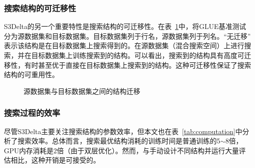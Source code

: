 \subsubsection{搜索结构的可迁移性}
S3Delta的另一个重要特性是搜索结构的可迁移性。在表~\ref{tab:transfer}中，将GLUE基准测试分为源数据集和目标数据集。目标数据集列于行名，源数据集列于列名。“无迁移” 表示该结构是在目标数据集上搜索得到的。在源数据集（混合搜索空间）上进行搜索，并在目标数据集上训练搜索到的结构。可以看出，搜索到的结构具有高度可迁移性，有时甚至优于直接在目标数据集上搜索到的结构。这种可迁移性保证了搜索结构的可重用性。

\begin{figure}
\caption{源数据集与目标数据集之间的结构迁移}
\centering
\label{tab:transfer}
\end{figure}



\subsubsection{搜索过程的效率}
尽管S3Delta主要关注搜索结构的参数效率，但本文也在表~\ref{tab:computation}中分析了搜索效率。总体而言，搜索最优结构消耗的训练时间是普通训练的5$\sim$8倍，GPU内存消耗是2倍（由于双层优化）。然而，与手动设计不同结构并运行大量评估相比，这种开销是可接受的。


